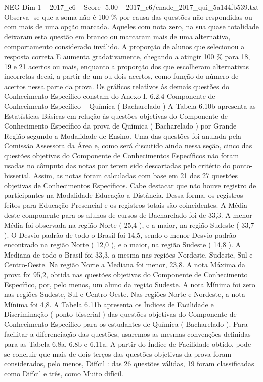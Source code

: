 \begin{textsample}{NEG Dim 1 – 2017\_c6 – Score -5.00 – 2017\_c6/enade\_2017\_qui\_5a144fb539.txt}
Observa -se que a soma não é 100 \% por causa das questões não respondidas ou com mais de uma opção marcada.
Aqueles com nota zero, na sua quase totalidade deixaram esta questão em branco ou marcaram mais de uma alternativa, comportamento considerado inválido.
A proporção de alunos que selecionou a resposta correta E aumenta gradativamente, chegando a atingir 100 \% para 18, 19 e 21 acertos ou mais, enquanto a proporção dos que escolheram alternativas incorretas decai, a partir de um ou dois acertos, como função do número de acertos nessa parte da prova.
Os gráficos relativos às demais questões do Conhecimento Específico constam do Anexo I. 6.2.4 Componente de Conhecimento Específico – Química ( Bacharelado ) A Tabela 6.10b apresenta as Estatísticas Básicas em relação às questões objetivas do Componente de Conhecimento Específico da prova de Química ( Bacharelado ) por Grande Região segundo a Modalidade de Ensino.
Uma das questões foi anulada pela Comissão Assessora da Área e, como será discutido ainda nessa seção, cinco das questões objetivas do Componente de Conhecimentos Específicos não foram usadas no cômputo das notas por terem sido descartadas pelo critério do ponto-bisserial.
Assim, as notas foram calculadas com base em 21 das 27 questões objetivas de Conhecimentos Específicos.
Cabe destacar que não houve registro de participantes na Modalidade Educação a Distância.
Dessa forma, os registros feitos para Educação Presencial e os registros totais são coincidentes.
A Média deste componente para os alunos de cursos de Bacharelado foi de 33,3.
A menor Média foi observada na região Norte ( 25,4 ), e a maior, na região Sudeste ( 33,7 ).
O Desvio padrão de todo o Brasil foi 14,5, sendo o menor Desvio padrão encontrado na região Norte ( 12,0 ), e o maior, na região Sudeste ( 14,8 ).
A Mediana de todo o Brasil foi 33,3, a mesma nas regiões Nordeste, Sudeste, Sul e Centro-Oeste.
Na região Norte a Mediana foi menor, 23,8.
A nota Máxima da prova foi 95,2, obtida nas questões objetivas do Componente de Conhecimento Específico, por, pelo menos, um aluno da região Sudeste.
A nota Mínima foi zero nas regiões Sudeste, Sul e Centro-Oeste.
Nas regiões Norte e Nordeste, a nota Mínima foi 4,8.
A Tabela 6.11b apresenta os Índices de Facilidade e Discriminação ( ponto-bisserial ) das questões objetivas do Componente de Conhecimento Específico para os estudantes de Química ( Bacharelado ).
Para facilitar a diferenciação das questões, usaremos as mesmas convenções definidas para as Tabela 6.8a, 6.8b e 6.11a.
A partir do Índice de Facilidade obtido, pode -se concluir que mais de dois terços das questões objetivas da prova foram considerados, pelo menos, Difícil : das 26 questões válidas, 19 foram classificadas como Difícil e três, como Muito difícil.

\end{textsample}
